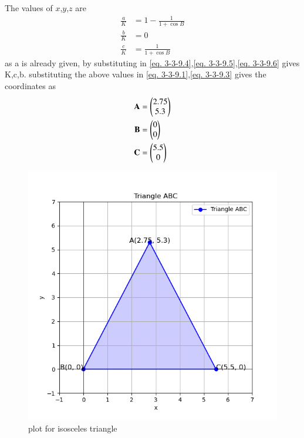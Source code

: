 \documentclass[journal]{IEEEtran}
\begin{document}
The values of $x$,$y$,$z$ are
\begin{align}
\frac{a}{K} &= 1 - \frac{1}{1+\cos B}\label{eq. 3-3-9.4}\\
\frac{b}{K} &= 0\label{eq. 3-3-9.5}\\
	\frac{c}{K} &= \frac{1}{1 + \cos B}\label{eq. 3-3-9.6}
\end{align}
as a is already given, by substituting in \ref{eq. 3-3-9.4},\ref{eq. 3-3-9.5},\ref{eq. 3-3-9.6} gives K,c,b.
substituting the above values in \ref{eq. 3-3-9.1},\ref{eq. 3-3-9.3} gives the coordinates as\\
\begin{align*}
     \textbf{A}&=\begin{pmatrix}2.75\\5.3\end{pmatrix}\\
     \textbf{B}&=\begin{pmatrix}0\\0\end{pmatrix}\\
     \textbf{C}&=\begin{pmatrix}5.5\\0\end{pmatrix}
\end{align*}


\begin{figure}[h!]
\centering
\includegraphics[width=0.7\columnwidth]{figs/Figure_1.png}
\caption{plot for isosceles triangle}
 \label{fig. 3-3-9-1}
\end{figure}
\end{document}
